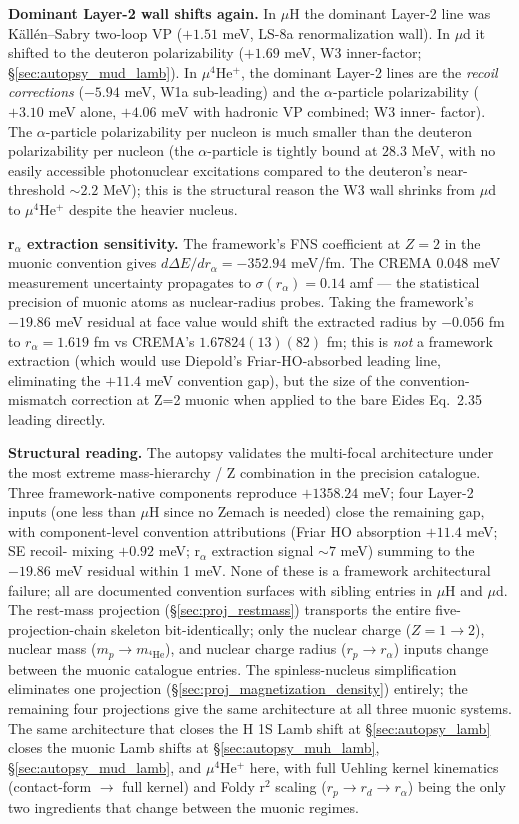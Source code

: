 \documentclass[11pt]{article}
\begin{document}
\textbf{Dominant Layer-2 wall shifts again.}  In $\mu$H the dominant
Layer-2 line was K\"all\'en--Sabry two-loop VP ($+1.51$ meV, LS-8a
renormalization wall).  In $\mu$d it shifted to the deuteron polarizability
($+1.69$ meV, W3 inner-factor; \S\ref{sec:autopsy_mud_lamb}).  In
$\mu^4$He$^+$, the dominant Layer-2 lines are the \emph{recoil corrections}
($-5.94$ meV, W1a sub-leading) and the $\alpha$-particle polarizability
($+3.10$ meV alone, $+4.06$ meV with hadronic VP combined; W3 inner-
factor).  The $\alpha$-particle polarizability per nucleon is much smaller
than the deuteron polarizability per nucleon (the $\alpha$-particle is
tightly bound at $28.3$ MeV, with no easily accessible photonuclear
excitations compared to the deuteron's near-threshold $\sim 2.2$ MeV);
this is the structural reason the W3 wall shrinks from $\mu$d to
$\mu^4$He$^+$ despite the heavier nucleus.

\textbf{r$_\alpha$ extraction sensitivity.}  The framework's FNS
coefficient at $Z=2$ in the muonic convention gives $d \Delta E /
d r_\alpha = -352.94$ meV/fm.  The CREMA 0.048 meV measurement
uncertainty propagates to $\sigma(r_\alpha) = 0.14$ amf --- the
statistical precision of muonic atoms as nuclear-radius probes.  Taking
the framework's $-19.86$ meV residual at face value would shift the
extracted radius by $-0.056$ fm to $r_\alpha = 1.619$ fm vs CREMA's
$1.67824(13)(82)$ fm; this is \emph{not} a framework extraction (which
would use Diepold's Friar-HO-absorbed leading line, eliminating the
$+11.4$ meV convention gap), but the size of the convention-mismatch
correction at Z=2 muonic when applied to the bare Eides Eq.~2.35
leading directly.

\textbf{Structural reading.}  The autopsy validates the multi-focal
architecture under the most extreme mass-hierarchy / Z combination in
the precision catalogue.  Three framework-native components reproduce
$+1358.24$ meV; four Layer-2 inputs (one less than $\mu$H since no
Zemach is needed) close the remaining gap, with component-level
convention attributions (Friar HO absorption $+11.4$ meV; SE recoil-
mixing $+0.92$ meV; r$_\alpha$ extraction signal $\sim 7$ meV) summing
to the $-19.86$ meV residual within 1 meV.  None of these is a framework
architectural failure; all are documented convention surfaces with sibling
entries in $\mu$H and $\mu$d.  The rest-mass projection
(\S\ref{sec:proj_restmass}) transports the entire five-projection-chain
skeleton bit-identically; only the nuclear charge ($Z = 1 \to 2$), nuclear
mass ($m_p \to m_{^4\text{He}}$), and nuclear charge radius ($r_p \to
r_\alpha$) inputs change between the muonic catalogue entries.  The
spinless-nucleus simplification eliminates one projection
(\S\ref{sec:proj_magnetization_density}) entirely; the remaining four
projections give the same architecture at all three muonic systems.
The same architecture that closes the H 1S Lamb shift at
\S\ref{sec:autopsy_lamb} closes the muonic Lamb shifts at
\S\ref{sec:autopsy_muh_lamb}, \S\ref{sec:autopsy_mud_lamb}, and
$\mu^4$He$^+$ here, with full Uehling kernel kinematics (contact-form
$\to$ full kernel) and Foldy r$^2$ scaling ($r_p \to r_d \to r_\alpha$)
being the only two ingredients that change between the muonic regimes.
\end{document}
